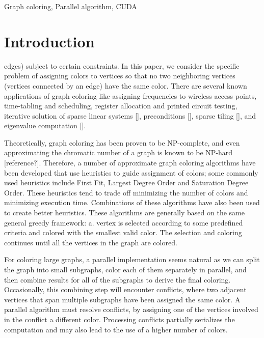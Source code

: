\documentclass[preprint]{sigplanconf}
\begin{document}
\keywords
Graph coloring, Parallel algorithm, CUDA

\section{Introduction}

edges) subject to certain constraints. In this paper, we consider the specific problem of assigning colors to vertices so that no two neighboring vertices (vertices connected by an edge) have the same color.  There are several known applications of graph coloring like assigning frequencies to wireless access points, time-tabling and scheduling, register allocation and printed circuit testing, iterative solution of sparse linear systems [], preconditions [], sparse tiling [], and eigenvalue computation [].  

Theoretically,  graph coloring has been proven to be NP-complete, and even approximating the chromatic number of a graph is known to be NP-hard [reference?]. Therefore, a number of approximate graph coloring algorithms have been developed that use heuristics to guide assignment of colors; some commonly used heuristics include First Fit, Largest Degree Order and Saturation Degree Order.  These heuristics tend to trade off minimizing the number of colors and minimizing execution time.  Combinations of these algorithms have also been used to create better heuristics. These algorithms are generally based on the same general greedy framework: a. vertex is selected according to some predefined criteria and colored with the smallest valid color. The selection and coloring continues until all the vertices in the graph are colored.

For coloring large graphs, a parallel implementation seems natural as we can split the graph into small subgraphs, color each of them separately in parallel, and then combine results for all of the subgraphs to derive the final coloring.   Occasionally, this combining step will encounter conflicts, where two adjacent vertices that span multiple subgraphs have been assigned the same color.  A parallel algorithm must resolve conflicts, by assigning one of the vertices involved in the conflict a different color.    Processing conflicts partially serializes the computation and may also lead to the use of a higher number of colors.
\end{document}
